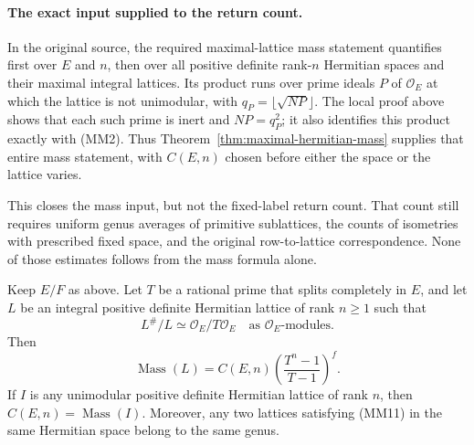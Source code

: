 \paragraph{The exact input supplied to the return count.}
In the original source, the required maximal-lattice mass statement
quantifies first over \(E\) and \(n\), then over all positive definite
rank-\(n\) Hermitian spaces and their maximal integral lattices.
Its product runs over prime ideals \(P\) of \(\mathcal O_E\) at
which the lattice is not unimodular, with
\(q_P=\lfloor\sqrt{N P}\rfloor\).
The local proof above shows that each such prime is inert and
\(N P=q_P^2\); it also identifies this product exactly with (MM2).
Thus Theorem~\ref{thm:maximal-hermitian-mass} supplies that entire
mass statement, with \(C(E,n)\) chosen before either the space or
the lattice varies.\cite{maximal-hermitian-mass-source}

This closes the mass input, but not the fixed-label return count.
That count still requires uniform genus averages of primitive
sublattices, the counts of isometries with prescribed fixed space,
and the original row-to-lattice correspondence.  None of those
estimates follows from the mass formula alone.

\begin{corollary}
\label{cor:cyclic-discriminant-mass}
Keep \(E/F\) as above.  Let \(T\) be a rational prime that splits
completely in \(E\), and let \(L\) be an integral positive definite
Hermitian lattice of rank \(n\geq1\) such that
\[
 L^\#/L\simeq\mathcal O_E/T\mathcal O_E
                     \quad\text{as }\mathcal O_E\text{-modules}.
 \tag{MM11}
\]
Then
\[
 \operatorname{Mass}(L)
  =C(E,n)\left(\frac{T^n-1}{T-1}\right)^f.
 \tag{MM12}
\]
If \(I\) is any unimodular positive definite Hermitian lattice of
rank \(n\), then \(C(E,n)=\operatorname{Mass}(I)\).  Moreover, any
two lattices satisfying (MM11) in the same Hermitian space belong
to the same genus.
\end{corollary}

